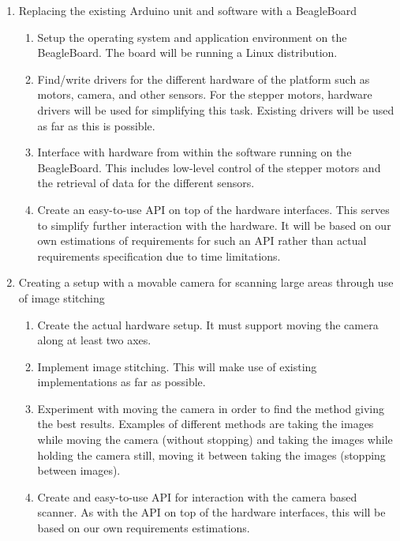 \documentclass[a4paper,11pt]{article}
\begin{document}
\begin{enumerate}

    \item Replacing the existing Arduino unit and software with a BeagleBoard
    \begin{enumerate}
        \item
          Setup the operating system and application environment on the
          BeagleBoard. The board will be running a Linux distribution.
        \item
          Find/write drivers for the different hardware of the platform such as
          motors, camera, and other sensors. For the stepper motors, hardware
          drivers will be used for simplifying this task. Existing drivers will
          be used as far as this is possible.
        \item
          Interface with hardware from within the software running on the
          BeagleBoard. This includes low-level control of the stepper motors and
          the retrieval of data for the different sensors.
        \item
          Create an easy-to-use API on top of the hardware interfaces. This
          serves to simplify further interaction with the hardware. It will be
          based on our own estimations of requirements for such an API rather
          than actual requirements specification due to time limitations.
    \end{enumerate}

    \item Creating a setup with a movable camera for scanning large
    areas through use of image stitching
    \begin{enumerate}
        \item
          Create the actual hardware setup. It must support moving the camera
          along at least two axes.
        \item
          Implement image stitching. This will make use of existing
          implementations as far as possible.
        \item
          Experiment with moving the camera in order to find the method giving
          the best results. Examples of different methods are taking the images
          while moving the camera (without stopping) and taking the images while
          holding the camera still, moving it between taking the images
          (stopping between images).
        \item
          Create and easy-to-use API for interaction with the camera based
          scanner. As with the API on top of the hardware interfaces, this will
          be based on our own requirements estimations.
    \end{enumerate}

\end{enumerate}
\end{document}

